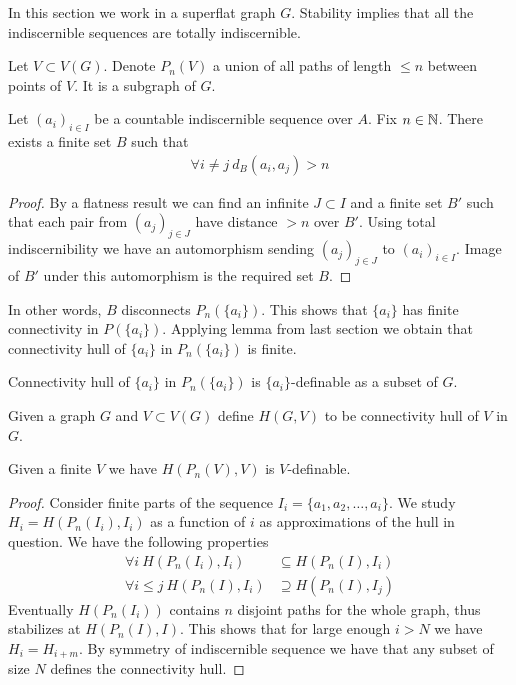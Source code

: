 \documentclass{amsart}
\begin{document}
In this section we work in a superflat graph $G$. Stability implies that all the indiscernible sequences are totally indiscernible.

Let $V \subset V(G)$. Denote $P_n(V)$ a union of all paths of length $\leq n$ between points of $V$. It is a subgraph of $G$.

\begin{Lemma}
	Let $(a_i)_{i \in I}$ be a countable indiscernible sequence over $A$. Fix $n \in \mathbb{N}$. There exists a finite set $B$ such that
	\begin{align*}
		\forall i \neq j \ d_B(a_i, a_j) > n
	\end{align*}
\end{Lemma}

\begin{proof}
	By a flatness result we can find an infinite $J \subset I$ and a finite set $B'$ such that each pair from $(a_j)_{j \in J}$ have distance $>n$ over $B'$. Using total indiscernibility we have an automorphism sending $(a_j)_{j \in J}$ to $(a_i)_{i \in I}$. Image of $B'$ under this automorphism is the required set $B$.
\end{proof}

In other words, $B$ disconnects $P_n(\{a_i\})$. This shows that $\{a_i\}$ has finite connectivity in $P(\{a_i\})$. Applying lemma from last section we obtain that connectivity hull of $\{a_i\}$ in $P_n(\{a_i\})$ is finite.

\begin{Lemma}
	Connectivity hull of $\{a_i\}$ in $P_n(\{a_i\})$ is $\{a_i\}$-definable as a subset of $G$.
\end{Lemma}

\begin{Definition}
	Given a graph $G$ and $V \subset V(G)$ define $H(G, V)$ to be connectivity hull of $V$ in $G$.
\end{Definition}

\begin{Note}
	Given a finite $V$ we have $H(P_n(V), V)$ is $V$-definable.
\end{Note}

\begin{proof}
	Consider finite parts of the sequence $I_i = \{a_1, a_2, \ldots, a_i\}$. We study $H_i = H(P_n(I_i), I_i)$ as a function of $i$ as approximations of the hull in question. We have the following properties
	\begin{align*}
		 \forall i \ H(P_n(I_i), I_i) &\subseteq H(P_n(I), I_i) \\
		 \forall i \leq j \ H(P_n(I), I_i) &\supseteq H(P_n(I), I_j)
	\end{align*}
		Eventually $H(P_n(I_i))$ contains $n$ disjoint paths for the whole graph, thus stabilizes at $H(P_n(I), I)$. This shows that for large enough $i>N$ we have $H_i = H_{i+m}$. By symmetry of indiscernible sequence we have that any subset of size $N$ defines the connectivity hull.
\end{proof}
\end{document}
